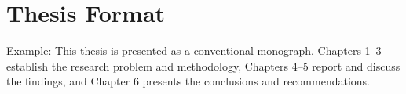\chapter*{Thesis Format}


Example: This thesis is presented as a conventional monograph. Chapters 1--3
establish the research problem and methodology, Chapters 4--5 report and discuss
the findings, and Chapter 6 presents the conclusions and recommendations.

